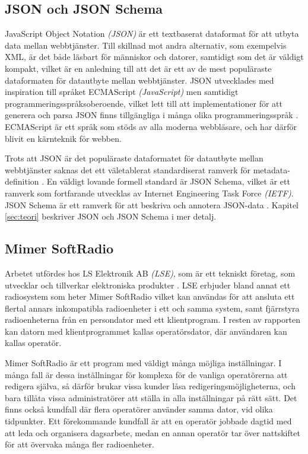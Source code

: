\subsection{JSON och JSON Schema}
\label{sec:intro:json}
JavaScript Object Notation \textit{(JSON)} är ett textbaserat dataformat för att utbyta data mellan webbtjänster. Till skillnad mot andra alternativ, som exempelvis XML, är det både läsbart för människor och datorer, samtidigt som det är väldigt kompakt, vilket är en anledning till att det är ett av de mest populäraste dataformaten för datautbyte mellan webbtjänster. \cite{Pezoa2016} JSON utvecklades med inspiration till språket ECMAScript \textit{(JavaScript)} men samtidigt programmeringsspråksoberoende, vilket lett till att implementationer för att generera och parsa JSON finns tillgängliga i många olika programmeringsspråk \cite{ECMA2013}. ECMAScript är ett språk som stöds av alla moderna webbläsare, och har därför blivit en kärnteknik för webben.

Trots att JSON är det populäraste dataformatet för datautbyte mellan webbtjänster saknas det ett väletablerat standardiserat ramverk för metadata-definition \cite{Pezoa2016}. En väldigt lovande formell standard är JSON Schema, vilket är ett ramverk som fortfarande utvecklas av Internet Engineering Task Force \textit{(IETF)}. JSON Schema är ett ramverk för att beskriva och annotera JSON-data \cite{A.Wright}. Kapitel \ref{sec:teori} beskriver JSON och JSON Schema i mer detalj.

\subsection{Mimer SoftRadio}
\label{sec:intro:mimer}
Arbetet utfördes hos LS Elektronik AB \textit{(LSE)}, som är ett tekniskt företag, som utvecklar och tillverkar elektroniska produkter \cite{Ehne}. LSE erbjuder bland annat ett radiosystem som heter Mimer SoftRadio vilket kan användas för att ansluta ett flertal annars inkompatibla radioenheter i ett och samma system, samt fjärrstyra radioenheterna från en persondator med ett klientprogram. I resten av rapporten kan datorn med klientprogrammet kallas operatörsdator, där användaren kan kallas operatör.

Mimer SoftRadio är ett program med väldigt många möjliga inställningar. I många fall är dessa inställningar för komplexa för de vanliga operatörerna att redigera själva, så därför brukar vissa kunder låsa redigeringsmöjligheterna, och bara tillåta vissa administratörer att ställa in alla inställningar på rätt sätt. Det finns också kundfall där flera operatörer använder samma dator, vid olika tidpunkter. Ett förekommande kundfall är att en operatör jobbade dagtid med att leda och organisera dagsarbete, medan en annan operatör tar över nattskiftet för att övervaka många fler radioenheter.

